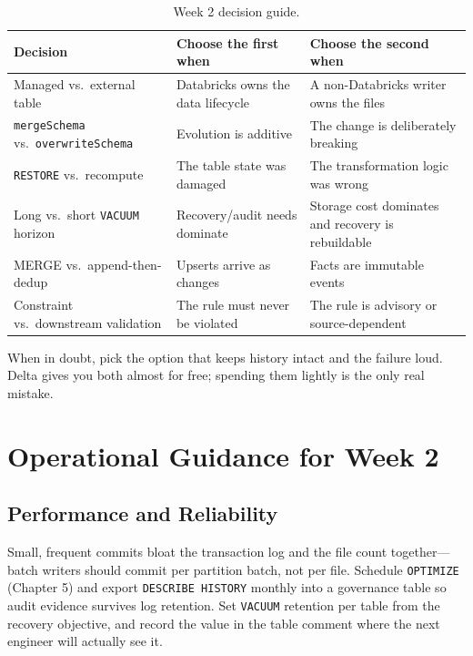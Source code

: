 \begin{table}[H]
\centering
\small
\begin{tabular}{@{}p{3.4cm}p{4.4cm}p{4.6cm}@{}}
\toprule
\textbf{Decision} & \textbf{Choose the first when} & \textbf{Choose the second when} \\
\midrule
Managed vs.\ external table & Databricks owns the data lifecycle & A non-Databricks writer owns the files \\
\texttt{mergeSchema} vs.\ \texttt{overwriteSchema} & Evolution is additive & The change is deliberately breaking \\
\texttt{RESTORE} vs.\ recompute & The table state was damaged & The transformation logic was wrong \\
Long vs.\ short \texttt{VACUUM} horizon & Recovery/audit needs dominate & Storage cost dominates and recovery is rebuildable \\
MERGE vs.\ append-then-dedup & Upserts arrive as changes & Facts are immutable events \\
Constraint vs.\ downstream validation & The rule must never be violated & The rule is advisory or source-dependent \\
\bottomrule
\end{tabular}
\caption{Week 2 decision guide.}
\label{tab:ch2-decisions}
\end{table}

When in doubt, pick the option that keeps history intact and the failure loud. Delta gives you both almost for free; spending them lightly is the only real mistake.

\section{Operational Guidance for Week 2}
%
\subsection{Performance and Reliability}
Small, frequent commits bloat the transaction log and the file count together---batch writers should commit per partition batch, not per file. Schedule \texttt{OPTIMIZE} (Chapter 5) and export \texttt{DESCRIBE HISTORY} monthly into a governance table so audit evidence survives log retention. Set \texttt{VACUUM} retention per table from the recovery objective, and record the value in the table comment where the next engineer will actually see it.

